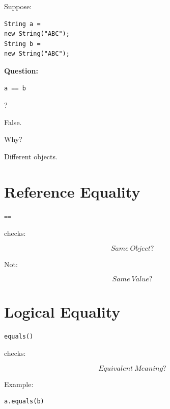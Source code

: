 \documentclass[11pt,a4paper]{book}
\begin{document}
Suppose:

\begin{verbatim}
String a =
new String("ABC");
String b =
new String("ABC");
\end{verbatim}


\textbf{Question:}

\begin{verbatim}
a == b
\end{verbatim}

?


False.


Why?

Different objects.


\section{Reference Equality}

\begin{verbatim}
==
\end{verbatim}

checks:

\[
Same\ Object?
\]


Not:

\[
Same\ Value?
\]


\section{Logical Equality}

\begin{verbatim}
equals()
\end{verbatim}

checks:

\[
Equivalent\ Meaning?
\]


Example:

\begin{verbatim}
a.equals(b)
\end{verbatim}
\end{document}
